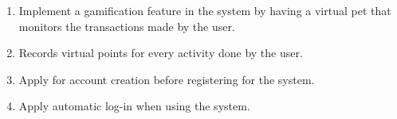 \begin{comment}
How to formulate your research objectives:
1. Identify what research steps do you need to perform to achieve your general objective.
2. Identify the questions that must be answered for you to achieve your general objective.
    Thereafter, convert these questions into action statements

Example #1:

Research Question:
  What are the general features of a web-based learning environment?

Specific Objective:
   To review existing web-based learning environment that teaches language learning for children


Example #2:

Research Question:
   How will you represent commonsense knowledge for use by computer systems?

Specific Objective:
   To identify knowledge representation approaches used by existing story generation systems

Example #3:
Research Question:
   What types of storytelling knowledge are needed to generate stories?

Specific Objective:
    To identify the different types of storytelling knowledge used in generating stories

Example #4:
Research Question:
    What machine learning approaches will you utilize?

Specific Objective:
    To determine existing machine learning algorithms [that can be used in training the computer system to detect cyberbullying cases] 

Example #5: Research Question:
    How will your research output be evaluated?

Specific Objective:
    To define evaluation metrics for validating the accuracy of the translation

\end{comment}

%
%

\begin{enumerate}
   \item Implement a gamification feature in the system by having a virtual pet that
   monitors the transactions made by the user.
   \item Records virtual points for every activity done by the user.
   \item Apply for account creation before registering for the system.
   \item Apply automatic log-in when using the system.
\end{enumerate}


